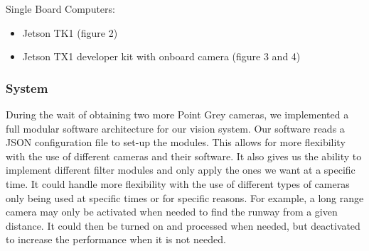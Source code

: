 \documentclass[letterpaper,10pt,titlepage]{IEEEtran}
\begin{document}
	Single Board Computers: 
		\begin{itemize}
		\item Jetson TK1 (figure 2) 
		\item Jetson TX1 developer kit with onboard camera (figure 3 and 4)\\
		\end{itemize}
   \subsubsection{System}
   During the wait of obtaining two more Point Grey cameras, we implemented a full modular software architecture for our vision system. Our software reads a JSON configuration file to set-up the modules. This allows for more flexibility with the use of different cameras and their software. It also gives us the ability to implement different filter modules and only apply the ones we want at a specific time. It could handle more flexibility with the use of different types of cameras only being used at specific times or for specific reasons. For example, a long range camera may only be activated when needed to find the runway from a given distance. It could then be turned on and processed when needed, but deactivated to increase the performance when it is not needed.\\ 
\end{document}
